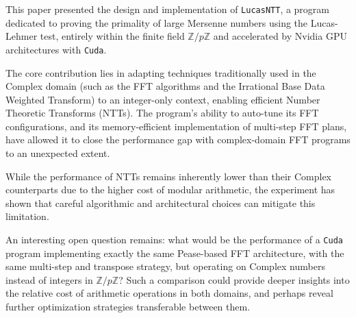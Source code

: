 \documentclass{article}
\begin{document}
This paper presented the design and implementation of \texttt{LucasNTT}, a program dedicated to proving the primality of large Mersenne numbers using the Lucas-Lehmer test, entirely within the finite field $\mathbb{Z}/p\mathbb{Z}$ and accelerated by Nvidia GPU architectures with \texttt{Cuda}. 

The core contribution lies in adapting techniques traditionally used in the Complex domain (such as the FFT algorithms and the Irrational Base Data Weighted Transform) to an integer-only context, enabling efficient Number Theoretic Transforms (NTTs). The program’s ability to auto-tune its FFT configurations, and its memory-efficient implementation of multi-step FFT plans, have allowed it to close the performance gap with complex-domain FFT programs to an unexpected extent.

While the performance of NTTs remains inherently lower than their Complex counterparts due to the higher cost of modular arithmetic, the experiment has shown that careful algorithmic and architectural choices can mitigate this limitation.

An interesting open question remains: what would be the performance of a \texttt{Cuda} program implementing exactly the same Pease-based FFT architecture, with the same multi-step and transpose strategy, but operating on Complex numbers instead of integers in $\mathbb{Z}/p\mathbb{Z}$? Such a comparison could provide deeper insights into the relative cost of arithmetic operations in both domains, and perhaps reveal further optimization strategies transferable between them.

\newpage
  

\end{document}
